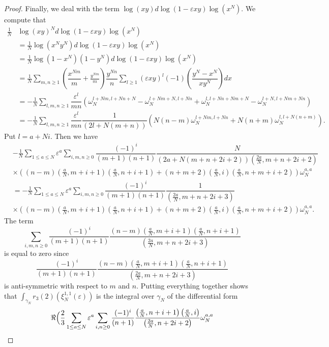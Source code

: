 \documentclass[11pt,a4,leqno]{amsart}
\theoremstyle{my theoremstyle}
\theoremstyle{dfn}
\theoremstyle{remark}
\renewcommand{\1}{\mathbbm{1}}
\newcommand{\e}{\varepsilon}
\numberwithin{equation}{section}
\begin{document}
\begin{proof}
Finally, we deal with the term $ \log (xy) d\log(1- \e xy) \log(x^N)$. 
We compute that 
\begin{align*}
\frac1N & \log  (xy)^N  d\log(1- \e xy) \log(x^N) \\
&=\frac1N\log (x^Ny^N) d\log(1- \e xy) \log(x^N) \\
&=\frac1N\log (1-x^N)(1-y^N) d\log(1- \e xy) \log(x^N) \\
&=\frac1N \sum_{m, n \ge 1} \left(\dfrac{x^{Nm}}{m} + \frac{y^{Nm}}{m} \right) \dfrac{y^{Nn}}{n} \sum_{l \ge 1} (\e xy)^l (-1) \left(\dfrac{y^N-x^N}{xy^N} \right)dx \\
&=- \frac1N \sum_{l, m, n \ge 1}\dfrac{\e^l}{mn}\left(\omega_N^{l+Nm, l+Nn+N} -\omega_N^{l+Nm+N, l+Nn} +\omega_N^{l, l+Nn+Nm+N} -\omega_N^{l+N, l+Nm+Nn} \right) \\
&=-\frac1N \sum_{l, m, n \ge 1}\dfrac{\e^l}{mn} \dfrac{1}{(2l+N(m+n))} \left(N(n-m)  \omega_N^{l+Nm, l+Nn} +N(n+m) \omega_N^{l, l+N(n+m)}\right). 
\end{align*}
Put $l = a+Ni$. Then we have 
\begin{align*}
&-\frac1N \sum_{1 \leq a \leq N} \e^a \sum_{i, m, n \ge 0}\dfrac{(-1)^i}{(m+1)(n+1)} \dfrac{N}{(2a+N(m+n+2i+2))\left(\frac{2a}N, m+n+2i+2 \right)} \\
& \times \left((n-m) \left(\frac{a}N, m+i+1 \right)\left(\frac{a}N, n+i+1 \right)+(n+m+2)\left(\frac{a}N, i \right)\left(\frac{a}N, n+m+i+2 \right) \right) \omega_N^{a, a} \\
&=-\frac1N \sum_{1 \leq a \leq N} \e^a  \sum_{i, m, n \ge 0}\dfrac{(-1)^i}{(m+1)(n+1)} \dfrac{1}{\left(\frac{2a}N, m+n+2i+3 \right)} \\
& \times \left((n-m) \left(\frac{a}N, m+i+1 \right)\left(\frac{a}N, n+i+1 \right)+(n+m+2)\left(\frac{a}N, i \right)\left(\frac{a}N, n+m+i+2 \right) \right) \omega_N^{a, a}. 
\end{align*}
The term 
$$\sum_{i, m, n \ge 0}\dfrac{(-1)^i}{(m+1)(n+1)} \dfrac{(n-m) \left(\frac{a}N, m+i+1 \right)\left(\frac{a}N, n+i+1 \right)}{\left(\frac{2a}N, m+n+2i+3 \right)}$$
is equal to zero since $$\frac{(-1)^i}{(m+1)(n+1)} \frac{(n-m) \left(\frac{a}N, m+i+1 \right)\left(\frac{a}N, n+i+1 \right)}{\left(\frac{2a}N, m+n+2i+3 \right)}$$ is anti-symmetric with respect to $m$ and $n$. 
Putting everything together shows that $\int_{\gamma_N} r_3(2)(\xi_N^{1,1}(\e))$ is the integral over $\gamma_N$ of the differential form
\begin{align*}
 & \Re \Bigl( \frac{2}{3}\sum_{1 \leq a \leq N} \e^a\sum_{i, n \ge 0} \dfrac{(-1)^i}{(n+1)} \dfrac{\left(\frac{a}N, n+i+1 \right)\left(\frac{a}N, i \right)}{\left(\frac{2a}N, n+2i+2 \right)} \omega_N^{a, a} \\

\end{align*}
\end{proof}
\end{document}
